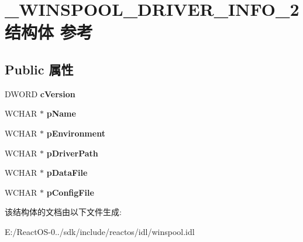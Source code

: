 \hypertarget{struct___w_i_n_s_p_o_o_l___d_r_i_v_e_r___i_n_f_o__2}{}\section{\+\_\+\+W\+I\+N\+S\+P\+O\+O\+L\+\_\+\+D\+R\+I\+V\+E\+R\+\_\+\+I\+N\+F\+O\+\_\+2结构体 参考}
\label{struct___w_i_n_s_p_o_o_l___d_r_i_v_e_r___i_n_f_o__2}
\subsection*{Public 属性}
\begin{DoxyCompactItemize}
\item 
\mbox{\label{struct___w_i_n_s_p_o_o_l___d_r_i_v_e_r___i_n_f_o__2_a61c14631f02885d03ab2073eb12a46e5}} 
D\+W\+O\+RD {\bfseries c\+Version}
\item 
\mbox{\label{struct___w_i_n_s_p_o_o_l___d_r_i_v_e_r___i_n_f_o__2_a5beb2905b6f62c682be62671bb58b3a8}} 
W\+C\+H\+AR $\ast$ {\bfseries p\+Name}
\item 
\mbox{\label{struct___w_i_n_s_p_o_o_l___d_r_i_v_e_r___i_n_f_o__2_ae34ee9ede5f2929ac09d7ab1b9937fa7}} 
W\+C\+H\+AR $\ast$ {\bfseries p\+Environment}
\item 
\mbox{\label{struct___w_i_n_s_p_o_o_l___d_r_i_v_e_r___i_n_f_o__2_ad1b81d5c6fb82536c736fd98d8738de6}} 
W\+C\+H\+AR $\ast$ {\bfseries p\+Driver\+Path}
\item 
\mbox{\label{struct___w_i_n_s_p_o_o_l___d_r_i_v_e_r___i_n_f_o__2_a45b370baa0f6947ab3fb3c32130f153e}} 
W\+C\+H\+AR $\ast$ {\bfseries p\+Data\+File}
\item 
\mbox{\label{struct___w_i_n_s_p_o_o_l___d_r_i_v_e_r___i_n_f_o__2_adbce676f5ba6c424e068cbc53a0b6226}} 
W\+C\+H\+AR $\ast$ {\bfseries p\+Config\+File}
\end{DoxyCompactItemize}


该结构体的文档由以下文件生成\+:\begin{DoxyCompactItemize}
\item 
E\+:/\+React\+O\+S-\/0../sdk/include/reactos/idl/winspool.\+idl\end{DoxyCompactItemize}
